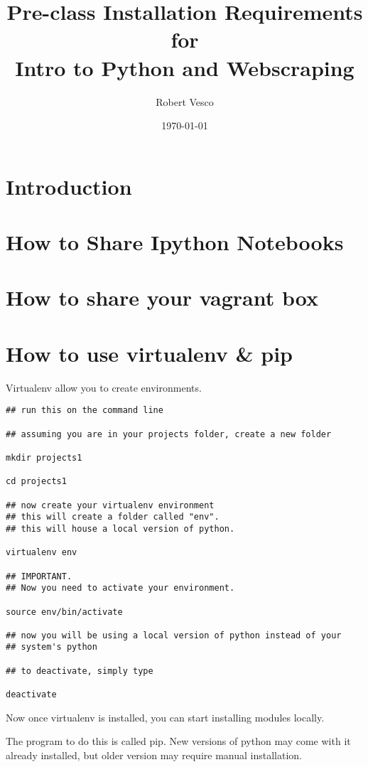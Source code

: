 \documentclass[letterpaper,10pt,microtype]{article}
\author{Robert Vesco}
\date{\today}
\title{Pre-class Installation Requirements for \\ Intro to Python and Webscraping}
\begin{document}
\maketitle
\tableofcontents


\section{Introduction}
\label{sec-1}


\section{How to Share Ipython Notebooks}
\label{sec-2}


\section{How to share your vagrant box}
\label{sec-3}


\section{How to use virtualenv \& pip}
\label{sec-4}

Virtualenv allow you to create environments. 

\lstset{numbers=left,language=sh}
\begin{lstlisting}
## run this on the command line

## assuming you are in your projects folder, create a new folder

mkdir projects1 

cd projects1

## now create your virtualenv environment
## this will create a folder called "env". 
## this will house a local version of python. 

virtualenv env 

## IMPORTANT. 
## Now you need to activate your environment. 

source env/bin/activate

## now you will be using a local version of python instead of your
## system's python

## to deactivate, simply type

deactivate
\end{lstlisting}

Now once virtualenv is installed, you can start installing modules
locally. 

The program to do this is called pip. New versions of python may come
with it already installed, but older version may require manual 
installation. 
\end{document}
